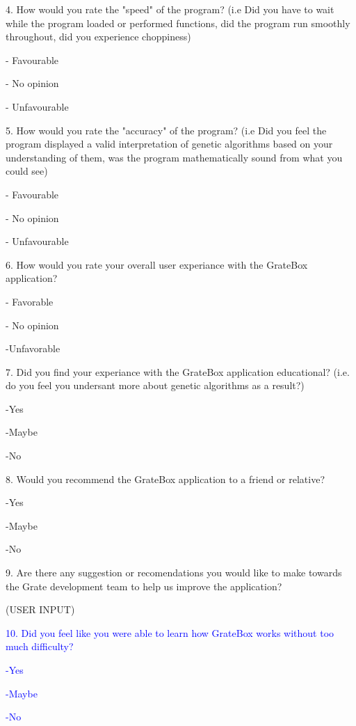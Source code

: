 \documentclass[12pt, titlepage]{article}
\begin{document}
4. How would you rate the "speed" of the program? (i.e Did you have to wait 
while the program loaded or performed functions, did the program run smoothly 
throughout, did you experience choppiness)

- Favourable

- No opinion

- Unfavourable

5. How would you rate the "accuracy" of the program? (i.e Did you feel the 
program displayed a valid interpretation of genetic algorithms based on your 
understanding of them, was the program mathematically sound from what you could 
see)

- Favourable

- No opinion

- Unfavourable

6. How would you rate your overall user experiance with the GrateBox
application?

- Favorable

- No opinion

-Unfavorable

7. Did you find your experiance with the GrateBox application educational? 
(i.e. do you feel you undersant more about genetic algorithms as a result?)

-Yes

-Maybe

-No

8. Would you recommend the GrateBox application to a friend or relative?

-Yes

-Maybe

-No

9. Are there any suggestion or recomendations you would like to make towards the 
Grate development team to help us improve the application?

(USER INPUT)

\textcolor{blue}{10. Did you feel like you were able to learn how GrateBox works 
without too much difficulty?}

\textcolor{blue}{-Yes}

\textcolor{blue}{-Maybe}

\textcolor{blue}{-No}
\end{document}
